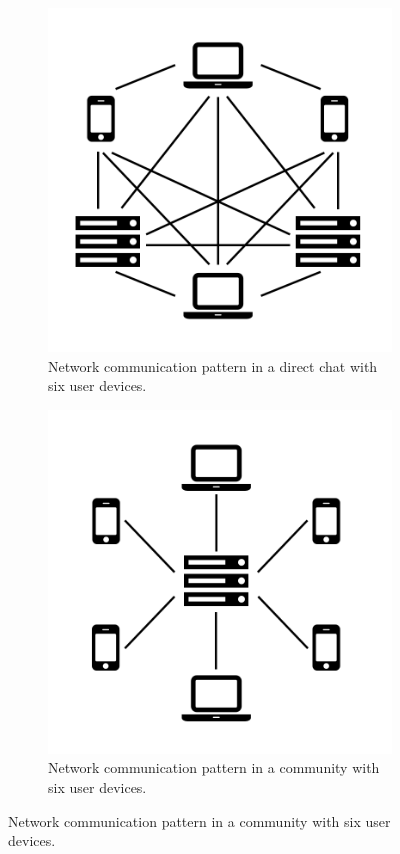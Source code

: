 \documentclass{article}
\begin{document}
\begin{figure}[htb!]
    \centering
     \begin{subfigure}[b]{0.49\textwidth}
         \centering
         \includegraphics[width=\textwidth]{img/1a.png}
         \caption{Network communication pattern in a direct chat with six user devices.}
         \label{fig:directchats}
     \end{subfigure}
     \hfill
     \begin{subfigure}[b]{0.49\textwidth}
         \centering
         \includegraphics[width=\textwidth]{img/1b.png}
         \caption{Network communication pattern in a community with six user devices.}
         \label{fig:communities}
     \end{subfigure}
\end{figure}
\end{document}
